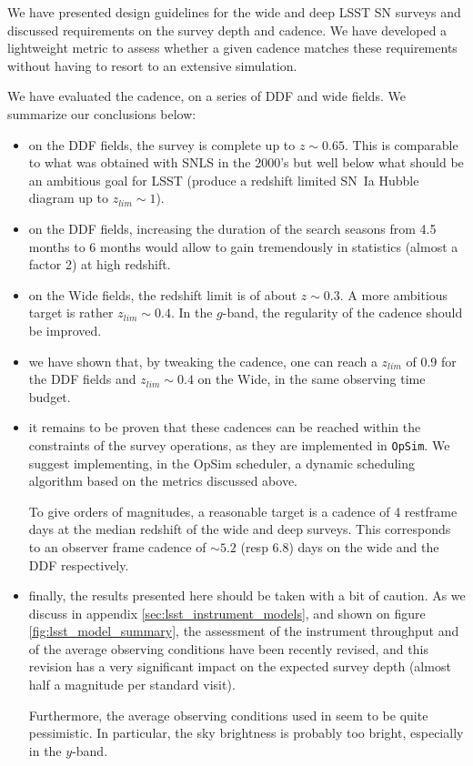 \documentclass[\docopts]{\docclass}
\begin{document}
We have presented design guidelines for the wide and deep LSST SN
surveys and discussed requirements on the survey depth and cadence.
We have developed a lightweight metric to assess whether a given
cadence matches these requirements without having to resort to an
extensive simulation.

We have evaluated the  cadence, on a series of DDF
and wide fields. We summarize our conclusions below:

\begin{itemize}
\item on the DDF fields, the survey is complete up to $z \sim
  0.65$. This is comparable to what was obtained with SNLS in the
  2000's but well below what should be an ambitious goal for LSST
  (produce a redshift limited SN~Ia Hubble diagram up to $z_{lim} \sim
  1$).

\item on the DDF fields, increasing the duration of the search seasons
  from 4.5 months to 6 months would allow to gain tremendously in
  statistics (almost a factor 2) at high redshift.
  
\item on the Wide fields, the redshift limit is of about $z \sim
  0.3$. A more ambitious target is rather $z_{lim} \sim 0.4$.  In the
  $g$-band, the regularity of the cadence should be improved.

\item we have shown that, by tweaking the cadence, one can reach a
  $z_{lim}$ of 0.9 for the DDF fields and $z_{lim} \sim 0.4$ on the
  Wide, in the same observing time budget.

\item it remains to be proven that these cadences can be reached
  within the constraints of the survey operations, as they are
  implemented in {\tt OpSim}.  We suggest implementing, in the OpSim
  scheduler, a dynamic scheduling algorithm based on the metrics
  discussed above.  
  
  To give orders of magnitudes, a reasonable target is a cadence of 4
  restframe days at the median redshift of the wide and deep surveys.
  This corresponds to an observer frame cadence of $\sim 5.2$ (resp
  6.8) days on the wide and the DDF respectively.

\item finally, the results presented here should be taken with a bit
  of caution.  As we discuss in appendix
  \ref{sec:lsst_instrument_models}, and shown on figure
  \ref{fig:lsst_model_summary}, the assessment of the instrument
  throughput and of the average observing conditions have been
  recently revised, and this revision has a very significant impact on
  the expected survey depth (almost half a magnitude per standard
  visit).  

  Furthermore, the average observing conditions used in
   seem to be quite pessimistic.  In particular,
  the  sky brightness is probably too bright,
  especially in the $y$-band.
\end{itemize}
\end{document}
